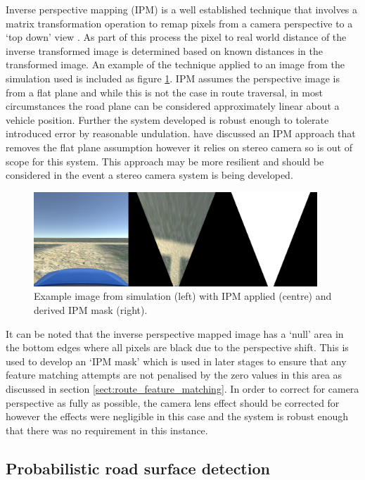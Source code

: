 \documentclass[]{aiaa-tc}%
\begin{document}
Inverse perspective mapping (IPM) is a well established technique that involves a matrix transformation operation to remap pixels from a camera perspective to a `top down' view \citep{compVisionTextbook}. As part of this process the pixel to real world distance of the inverse transformed image is determined based on known distances in the transformed image. An example of the technique applied to an image from the simulation used is included as figure \ref{f:ipmSim}. IPM assumes the perspective image is from a flat plane \citep{ipmForLaneTracking} and while this is not the case in route traversal, in most circumstances the road plane can be considered approximately linear about a vehicle position. Further the system developed is robust enough to tolerate introduced error by reasonable undulation. \citep{extendedIPM} have discussed an IPM approach that removes the flat plane assumption however it relies on stereo camera so is out of scope for this system. This approach may be more resilient and should be considered in the event a stereo camera system is being developed.


\begin{figure}
	\centering
	\includegraphics[width=0.95\textwidth]{RoadDetection/ipmSim.png}
	\caption{Example image from simulation (left) with IPM applied (centre) and derived IPM mask (right).}
	\label{f:ipmSim}
\end{figure}

It can be noted that the inverse perspective mapped image has a `null' area in the bottom edges where all pixels are black due to the perspective shift. This is used to develop an `IPM mask' which is used in later stages to ensure that any feature matching attempts are not penalised by the zero values in this area as discussed in section \ref{sect:route_feature_matching}. In order to correct for camera perspective as fully as possible, the camera lens effect should be corrected for \citep{fisheyeEffect} however the effects were negligible in this case and the system is robust enough that there was no requirement in this instance.

\subsection{Probabilistic road surface detection}
\end{document}
